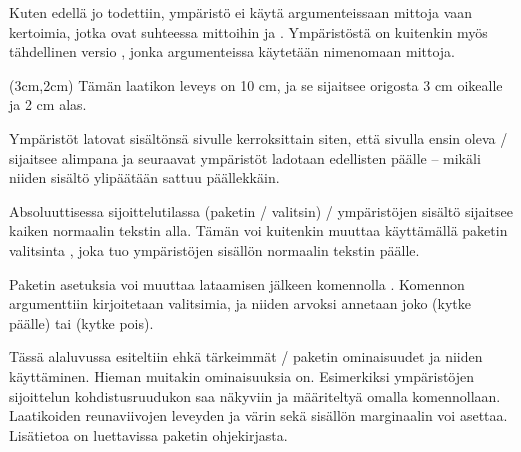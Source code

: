 \begin{koodilohkosis}
\usepackage[showboxes]{textpos}
\end{koodilohkosis}

\noindent
Kuten edellä jo todettiin, ympäristö  ei käytä
argumenteissaan mittoja vaan kertoimia, jotka ovat suhteessa mittoihin
 ja . Ympäristöstä on kuitenkin
myös tähdellinen versio , jonka argumenteissa
käytetään nimenomaan mittoja.

\begin{koodilohkosis}
\begin{textblock*}{10cm}(3cm,2cm)
  Tämän laatikon leveys on 10 cm, ja se sijaitsee origosta 3 cm
  oikealle ja 2 cm alas.
\end{textblock*}
\end{koodilohkosis}

\noindent
Ympäristöt latovat sisältönsä sivulle kerroksittain siten, että sivulla
ensin oleva \-/ sijaitsee alimpana ja seuraavat
ympäristöt ladotaan edellisten päälle -- mikäli niiden sisältö
ylipäätään sattuu päällekkäin.

Absoluuttisessa sijoittelutilassa (paketin \-/ valitsin)
\-/ ympäristöjen sisältö sijaitsee kaiken normaalin
tekstin alla. Tämän voi kuitenkin muuttaa käyttämällä paketin valitsinta
, joka tuo ympäristöjen sisällön normaalin tekstin
päälle.

Paketin asetuksia voi muuttaa lataamisen jälkeen komennolla
. Komennon argumenttiin kirjoitetaan valitsimia, ja
niiden arvoksi annetaan joko  (kytke päälle) tai
 (kytke pois).

\begin{koodilohkosis}
\end{koodilohkosis}

\noindent
Tässä alaluvussa esiteltiin ehkä tärkeimmät \-/ paketin
ominaisuudet ja niiden käyttäminen. Hieman muitakin ominaisuuksia on.
Esimerkiksi ympäristöjen sijoittelun kohdistusruudukon saa näkyviin ja
määriteltyä omalla komennollaan. Laatikoiden reunaviivojen leveyden ja
värin sekä sisällön marginaalin voi asettaa. Lisätietoa on luettavissa
paketin ohjekirjasta.
